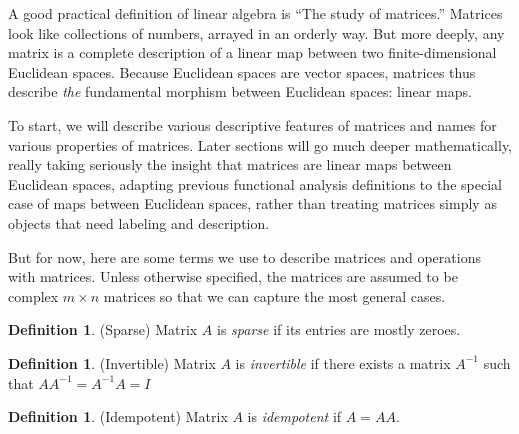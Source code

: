 \documentclass[12pt]{book}
\numberwithin{equation}{section} %
\theoremstyle{plain}
\theoremstyle{definition}
\newtheorem{defn}[thm]{Definition}
\theoremstyle{remark}
\begin{document}
A good practical definition of linear algebra is ``The study of
matrices.''
Matrices look like collections of numbers, arrayed in an orderly way.
But more deeply, any matrix is a complete description of a linear map
between two finite-dimensional Euclidean spaces.
Because Euclidean spaces are vector spaces, matrices thus describe
\emph{the} fundamental morphism between Euclidean spaces: linear maps.

To start, we will describe various descriptive features of matrices and
names for various properties of matrices.
Later sections will go much deeper mathematically, really taking
seriously the insight that matrices are linear maps between Euclidean
spaces, adapting previous functional analysis definitions to the special
case of maps between Euclidean spaces, rather than treating matrices
simply as objects that need labeling and description.

But for now, here are some terms we use to describe matrices and
operations with matrices. Unless otherwise specified, the matrices are
assumed to be complex $m\times n$ matrices so that we can capture the
most general cases.


\begin{defn}{(Sparse)}
Matrix $A$ is \emph{sparse} if its entries are mostly zeroes.
\end{defn}

\begin{defn}{(Invertible)}
Matrix $A$ is \emph{invertible} if there exists a matrix $A^{-1}$ such
that $A A^{-1} = A^{-1}A=I$
\end{defn}


\begin{defn}(Idempotent)
Matrix $A$ is \emph{idempotent} if $A = AA$.
\end{defn}
\end{document}
